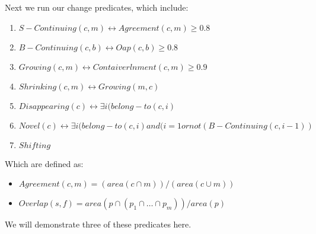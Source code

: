 \documentclass[conference]{IEEEtran}
\begin{document}
Next we run our change predicates, which include:

\begin{enumerate}
	\item $S-Continuing (c,m)  \leftrightarrow  Agreement (c,m) \geq 0.8$
	\item $B-Continuing(c,b)  \leftrightarrow  Oap (c,b) \geq 0.8$
	\item $Growing(c,m)  \leftrightarrow  Contaiverlnment (c,m) \geq 0.9 $
	\item $Shrinking(c,m) \leftrightarrow Growing (m,c)$
	\item $Disappearing(c) \leftrightarrow \exists i (belong-to(c,i) $
	\item $Novel (c) \leftrightarrow  \exists i (belong-to(c,i) and (i=1 or not(B-Continuing(c,i-1)) $
	\item $Shifting$

\end{enumerate}

Which are defined as:

\begin{itemize}
	\item $Agreement (c, m) = (area(c\cap m))/(area(c\cup m))$

	\item $Overlap(s,f)= area(p\cap (p_1\cap …\cap p_m))/area(p)$

\end{itemize}

We will demonstrate three of these predicates here.
\end{document}
